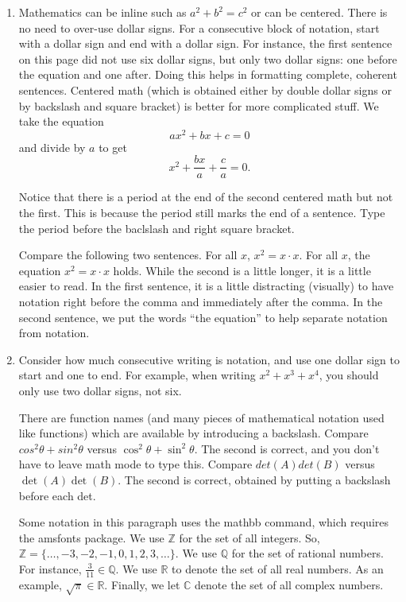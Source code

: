 \documentclass{article}
\newcommand\Z{\mathbb{Z}}
\newcommand\Q{\mathbb{Q}}
\newcommand\R{\mathbb{R}}
\newcommand\C{\mathbb{C}}
\begin{document}
\begin{enumerate}
\newpage

\item Mathematics can be inline such as $a^2 + b^2 = c^2$ or can be centered. There is no need to over-use dollar signs. For a consecutive block of notation, start with a dollar sign and end with a dollar sign. For instance, the first sentence on this page did not use six dollar signs, but only two dollar signs: one before the equation and one after. Doing this helps in formatting complete, coherent sentences. Centered math (which is obtained either by double dollar signs or by backslash and square bracket) is better for more complicated stuff. We take the equation \[ax^2 + bx + c = 0\] and divide by $a$ to get \[x^2 + \frac{bx}{a} + \frac{c}{a} = 0.\]

Notice that there is a period at the end of the second centered math but not the first. This is because the period still marks the end of a sentence. Type the period before the baclslash and right square bracket.

Compare the following two sentences. For all $x$, $x^2 = x \cdot x$. For all $x$, the equation $x^2 = x \cdot x$ holds. While the second is a little longer, it is a little easier to read. In the first sentence, it is a little distracting (visually) to have notation right before the comma and immediately after the comma. In the second sentence, we put the words ``the equation'' to help separate notation from notation.

\newpage

\item Consider how much consecutive writing is notation, and use one dollar sign to start and one to end. For example, when writing $x^2 + x^3 + x^4$, you should only use two dollar signs, not six.

There are function names (and many pieces of mathematical notation used like functions) which are available by introducing a backslash. Compare $cos^2\theta + sin^2\theta$ versus $\cos^2\theta + \sin^2\theta$. The second is correct, and you don't have to leave math mode to type this. Compare $det(A)det(B)$ versus $\det(A)\det(B)$. The second is correct, obtained by putting a backslash before each det.

Some notation in this paragraph uses the mathbb command, which requires the amsfonts package. We use $\Z$ for the set of all integers. So, $\Z = \{\dots, -3, -2, -1, 0, 1, 2, 3, \dots\}$. We use $\Q$ for the set of rational numbers. For instance, $\frac{3}{11}\in\Q$. We use $\R$ to denote the set of all real numbers. As an example, $\sqrt{\pi}\in\R$. Finally, we let $\C$ denote the set of all complex numbers.


\end{enumerate}
\end{document}
